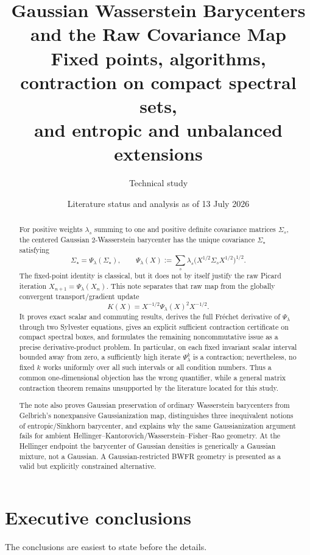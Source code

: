 \documentclass[11pt]{article}
\title{\bfseries Gaussian Wasserstein Barycenters and the Raw Covariance Map\\
\large Fixed points, algorithms, contraction on compact spectral sets,\\
and entropic and unbalanced extensions}
\author{Technical study}
\date{Literature status and analysis as of 13 July 2026}
\theoremstyle{definition}
\begin{document}
\maketitle

\begin{abstract}
For positive weights $\lambda_s$ summing to one and positive definite covariance
matrices $\Sigma_s$, the centered Gaussian $2$-Wasserstein barycenter has the
unique covariance $\Sigma_\star$ satisfying
\[
  \Sigma_\star=\Psi_\lambda(\Sigma_\star),\qquad
  \Psi_\lambda(X):=\sum_s\lambda_s
  \bigl(X^{1/2}\Sigma_sX^{1/2}\bigr)^{1/2}.
\]
The fixed-point identity is classical, but it does not by itself justify the raw
Picard iteration $X_{n+1}=\Psi_\lambda(X_n)$.  This note separates that raw map
from the globally convergent transport/gradient update
\[
  K(X)=X^{-1/2}\Psi_\lambda(X)^2X^{-1/2}.
\]
It proves exact scalar and commuting results, derives the full Fr\'echet derivative
of $\Psi_\lambda$ through two Sylvester equations, gives an explicit sufficient
contraction certificate on compact spectral boxes, and formulates the remaining
noncommutative issue as a precise derivative-product problem.  In particular,
on each fixed invariant scalar interval bounded away from zero, a sufficiently
high iterate $\Psi_\lambda^k$ is a contraction; nevertheless, no fixed $k$ works
uniformly over all such intervals or all condition numbers.  Thus a common
one-dimensional objection has the wrong quantifier, while a general matrix
contraction theorem remains unsupported by the literature located for this
study.

The note also proves Gaussian preservation of ordinary Wasserstein barycenters
from Gelbrich's nonexpansive Gaussianization map, distinguishes three inequivalent
notions of entropic/Sinkhorn barycenter, and explains why the same Gaussianization
argument fails for ambient Hellinger--Kantorovich/Wasserstein--Fisher--Rao
geometry.  At the Hellinger endpoint the barycenter of Gaussian densities is
generically a Gaussian mixture, not a Gaussian.  A Gaussian-restricted BWFR
geometry is presented as a valid but explicitly constrained alternative.
\end{abstract}

\tableofcontents

\section{Executive conclusions}

The conclusions are easiest to state before the details.
\end{document}
